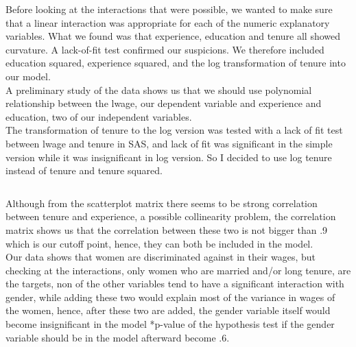 \documentclass[12pt,a4paper,twoside]{article}
\begin{document}
Before looking at the interactions that were possible, we wanted to make sure that a linear interaction was appropriate for each of the numeric explanatory variables. What we found was that experience, education and tenure all showed curvature. A lack-of-fit test confirmed our suspicions. We therefore included education squared, experience squared, and the log transformation of tenure into our model.\\

A preliminary study of the data shows us that we should use polynomial relationship between the lwage, our dependent variable and experience and education, two of our independent variables.\\
The transformation of tenure to the log version was tested with a lack of fit test between lwage and tenure in SAS, and lack of fit was significant in the simple version while it was insignificant in log version. So I decided to use log tenure instead of tenure and tenure squared.\\
\begin{tabular}{l l}



\end{tabular}

Although from the scatterplot matrix there seems to be strong correlation between tenure and experience, a possible collinearity problem, the correlation matrix shows us that the correlation between these two is not bigger than .9 which is our cutoff point, hence, they can both be included in the model.\\


Our data shows that women are discriminated against in their wages, but checking at the interactions, only women who are married and/or long tenure, are the targets, non of the other variables tend to have a significant interaction with gender, while adding these two would explain most of the variance in wages of the women, hence, after these two are added, the gender variable itself would become insignificant in the model
	*p-value of the hypothesis test if the gender variable should be in the model afterward become .6.  
\begin{tabular}{c c}
\end{tabular}
\end{document}
